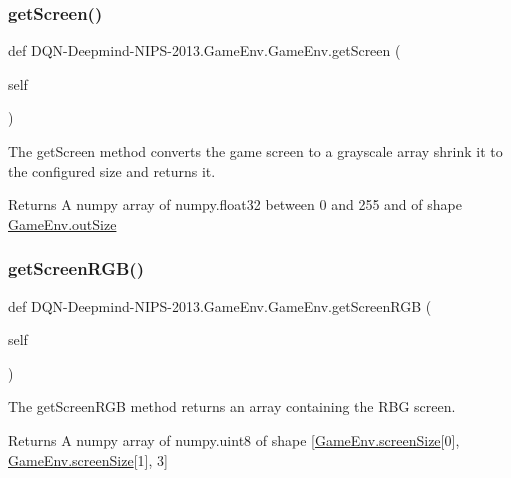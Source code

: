 \subsubsection{\texorpdfstring{get\+Screen()}{getScreen()}}
{\footnotesize\ttfamily def D\+QN-\/Deepmind-\/N\+I\+PS-\/2013.Game\+Env.\+Game\+Env.\+get\+Screen (\begin{DoxyParamCaption}\item[{}]{self }\end{DoxyParamCaption})}



The get\+Screen method converts the game screen to a grayscale array shrink it to the configured size and returns it. 

\begin{DoxyReturn}{Returns}
A numpy array of numpy.\+float32 between 0 and 255 and of shape \hyperlink{classDQN-Deepmind-NIPS-2013_1_1GameEnv_1_1GameEnv_ae8e7e56bd996ea0ce4ece1ca32f6b54a}{Game\+Env.\+out\+Size} 
\end{DoxyReturn}
\hypertarget{classDQN-Deepmind-NIPS-2013_1_1GameEnv_1_1GameEnv_a553c6eac3cac494bff5c9703dcfea2fe}{}\label{classDQN-Deepmind-NIPS-2013_1_1GameEnv_1_1GameEnv_a553c6eac3cac494bff5c9703dcfea2fe} 
\subsubsection{\texorpdfstring{get\+Screen\+R\+G\+B()}{getScreenRGB()}}
{\footnotesize\ttfamily def D\+QN-\/Deepmind-\/N\+I\+PS-\/2013.Game\+Env.\+Game\+Env.\+get\+Screen\+R\+GB (\begin{DoxyParamCaption}\item[{}]{self }\end{DoxyParamCaption})}



The get\+Screen\+R\+GB method returns an array containing the R\+BG screen. 

\begin{DoxyReturn}{Returns}
A numpy array of numpy.\+uint8 of shape \mbox{[}\hyperlink{classDQN-Deepmind-NIPS-2013_1_1GameEnv_1_1GameEnv_a2dedb2f4e5f0f1b7da2970ac89a5b544}{Game\+Env.\+screen\+Size}\mbox{[}0\mbox{]}, \hyperlink{classDQN-Deepmind-NIPS-2013_1_1GameEnv_1_1GameEnv_a2dedb2f4e5f0f1b7da2970ac89a5b544}{Game\+Env.\+screen\+Size}\mbox{[}1\mbox{]}, 3\mbox{]} 
\end{DoxyReturn}
\hypertarget{classDQN-Deepmind-NIPS-2013_1_1GameEnv_1_1GameEnv_ab2efa70a8316abde73936602001654a6}{}\label{classDQN-Deepmind-NIPS-2013_1_1GameEnv_1_1GameEnv_ab2efa70a8316abde73936602001654a6} 
